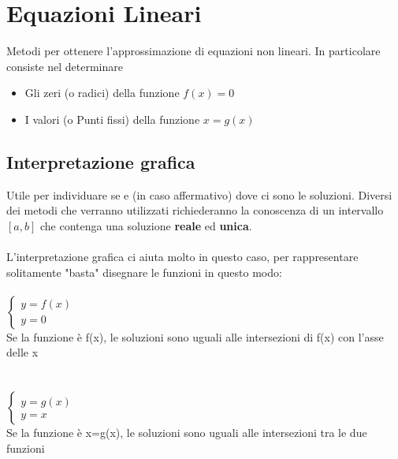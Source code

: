 \section{Equazioni Lineari}
\label{Equazioni Lineari}

Metodi per ottenere l'approssimazione di equazioni non lineari. In particolare consiste nel determinare
\begin{itemize}
	\item Gli zeri (o radici) della funzione $f(x) = 0$
	\item I valori (o Punti fissi) della funzione $x = g(x)$
\end{itemize}

\subsection{Interpretazione grafica}
\label{Interpretazione grafica}
Utile per individuare se e (in caso affermativo) dove ci sono le soluzioni.
Diversi dei metodi che verranno utilizzati richiederanno la conoscenza di un intervallo $[a,b]$ che contenga una soluzione \textbf{reale} ed \textbf{unica}.
\\ \\
L'interpretazione grafica ci aiuta molto in questo caso, per rappresentare solitamente "basta" disegnare le funzioni in questo modo:
\\ \\
$\left\{
  \begin{array}{lr}
    y=f(x) \\
    y=0
  \end{array}
\right.$
\\
Se la funzione è f(x), le soluzioni sono uguali alle intersezioni di f(x) con l'asse delle x
\\ \\ \\
$\left\{
  \begin{array}{lr}
    y=g(x) \\
    y=x
  \end{array}
\right.$
\\
Se la funzione è x=g(x), le soluzioni sono uguali alle intersezioni tra le due funzioni

\newpage

